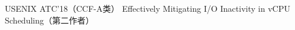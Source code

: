 \cvpub
{USENIX ATC'18（CCF-A类）} %
{Effectively Mitigating I/O Inactivity in vCPU Scheduling（第二作者）} %
{} %
{} %
{ %
}
